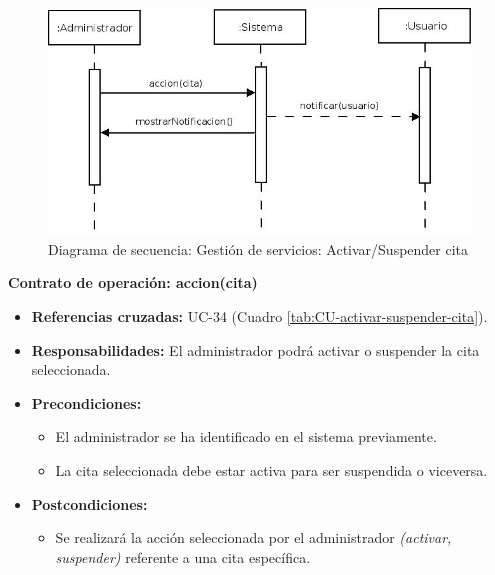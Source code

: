 \begin{figure}[H]
\centering
  \includegraphics[scale=.55]{img/secuencias/gestion-servicios-suspender-activar-cita.jpeg}
  \caption{Diagrama de secuencia: Gestión de servicios: Activar/Suspender cita}
  \label{fig:secuencia-gestion-servicios-suspender-activar-cita}
\end{figure}

\textbf{Contrato de operación: accion(cita)}
\begin{itemize}
\item \textbf{Referencias cruzadas:} UC-34 (Cuadro \ref{tab:CU-activar-suspender-cita}).
\item \textbf{Responsabilidades:} El administrador podrá activar o suspender la cita seleccionada.
\item \textbf{Precondiciones:} 
 \begin{itemize}
\item El administrador se ha identificado en el sistema previamente.
\item La cita seleccionada debe estar activa para ser suspendida o viceversa.
\end {itemize}
\item \textbf{Postcondiciones:} 
 \begin{itemize}
\item Se realizará la acción seleccionada por el administrador \textit{(activar, suspender)} referente a una cita específica.
\end {itemize}
\end {itemize}

